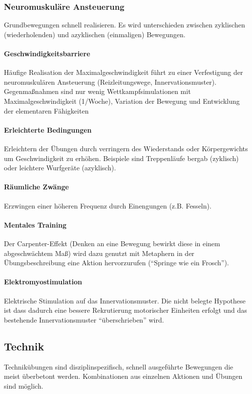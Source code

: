 \subsubsection{Neuromuskuläre Ansteuerung}
Grundbewegungen schnell realisieren. Es wird unterschieden zwischen zyklischen (wiederholenden) und azyklischen (einmaligen) Bewegungen.
\paragraph{Geschwindigkeitsbarriere} Häufige Realisation der Maximalgeschwindigkeit führt zu einer Verfestigung der neuromuskulären Ansteuerung (Reizleitungswege, Innervationsmuster).
Gegenmaßnahmen sind nur wenig Wettkampfsimulationen mit Maximalgeschwindigkeit (1/Woche), Variation der Bewegung und Entwicklung der elementaren Fähigkeiten
\paragraph{Erleichterte Bedingungen} Erleichtern der Übungen durch verringern des Wiederstands oder Körpergewichts um Geschwindigkeit zu erhöhen.
Beispiele sind Treppenläufe bergab (zyklisch) oder leichtere Wurfgeräte (azyklisch).
\paragraph{Räumliche Zwänge} Erzwingen einer höheren Frequenz durch Einengungen (z.B. Fesseln).
\paragraph{Mentales Training} Der Carpenter-Effekt (Denken an eine Bewegung bewirkt diese in einem abgeschwächtem Maß) wird dazu genutzt mit Metaphern in der Übungsbeschreibung eine Aktion hervorzurufen (``Springe wie ein Frosch'').
\paragraph{Elektromyostimulation} Elektrische Stimulation auf das Innervationsmuster. Die nicht belegte Hypothese ist dass dadurch eine bessere Rekrutierung motorischer Einheiten erfolgt und das bestehende Innervationsmuster ``überschrieben'' wird.

\subsection{Technik}
Technikübungen sind disziplinspezifisch, schnell ausgeführte Bewegungen die meist überbetont werden.
Kombinationen aus einzelnen Aktionen und Übungen sind möglich.
